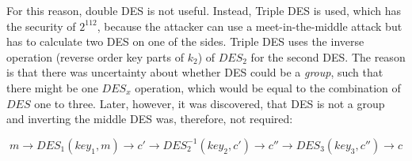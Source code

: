 For this reason, double DES is not useful. Instead, Triple DES is used, which has the security of $2^{112}$, because the attacker can use a meet-in-the-middle attack but has to calculate two DES on one of the sides. Triple DES uses the inverse operation (reverse order key parts of $k_2$) of $DES_2$ for the second DES. The reason is that there was uncertainty about whether DES could be a \textit{group}, such that there might be one $DES_{x}$ operation, which would be equal to the combination of $DES$ one to three. Later, however, it was discovered, that DES is not a group and inverting the middle DES was, therefore, not required:

$$
    m \rightarrow DES_{1}(key_1, m) \rightarrow c' \rightarrow DES^{-1}_{2}(key_2, c') \rightarrow c'' \rightarrow DES_{3}(key_3, c'') \rightarrow c
$$